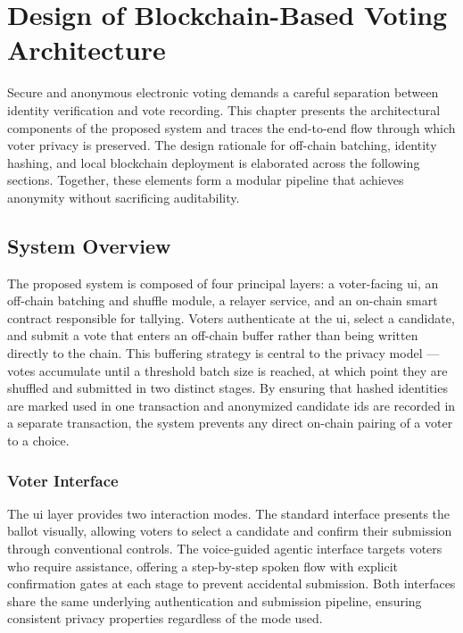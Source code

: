 
\chapter{Design of Blockchain-Based Voting Architecture}

Secure and anonymous electronic voting demands a careful separation between identity verification and vote recording. This chapter presents the architectural components of the proposed system and traces the end-to-end flow through which voter privacy is preserved. The design rationale for off-chain batching, identity hashing, and local blockchain deployment is elaborated across the following sections. Together, these elements form a modular pipeline that achieves anonymity without sacrificing auditability.

\section{System Overview}

The proposed system is composed of four principal layers: a voter-facing \gls{ui}, an off-chain batching and shuffle module, a relayer service, and an on-chain smart contract responsible for tallying. Voters authenticate at the \gls{ui}, select a candidate, and submit a vote that enters an off-chain buffer rather than being written directly to the chain. This buffering strategy is central to the privacy model — votes accumulate until a threshold batch size is reached, at which point they are shuffled and submitted in two distinct stages. By ensuring that hashed identities are marked used in one transaction and anonymized candidate \glspl{id} are recorded in a separate transaction, the system prevents any direct on-chain pairing of a voter to a choice.

\subsection{Voter Interface}

The \gls{ui} layer provides two interaction modes. The standard interface presents the ballot visually, allowing voters to select a candidate and confirm their submission through conventional controls. The voice-guided agentic interface targets voters who require assistance, offering a step-by-step spoken flow with explicit confirmation gates at each stage to prevent accidental submission. Both interfaces share the same underlying authentication and submission pipeline, ensuring consistent privacy properties regardless of the mode used.

